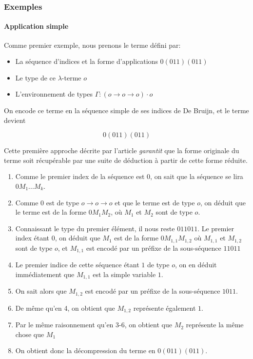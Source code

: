 \documentclass[titlepage]{article}
\providecommand{\tightlist}{%
  \setlength{\itemsep}{0pt}\setlength{\parskip}{0pt}}
\let\oldparagraph\paragraph
\renewcommand{\paragraph}[1]{\oldparagraph{#1}\mbox{}}
\begin{document}
\subsubsection{Exemples}\label{exemples}

\paragraph{Application simple}

Comme premier exemple, nous prenons le terme défini par:

\begin{itemize}
\tightlist
\item
  La séquence d'indices et la forme d'applications \(0(011)(011)\)
\item
  Le type de ce \(\lambda\)-terme \(o\)
\item
  L'environnement de types
  \(\Gamma: (o \rightarrow o \rightarrow o) \cdot o\)
\end{itemize}

On encode ce terme en la séquence simple de ses indices de De Bruijn, et
le terme devient

\[0(011)(011)\]

Cette première approche décrite par l'article \emph{garantit} que la
forme originale du terme soit récupérable par une suite de déduction à
partir de cette forme réduite.

\begin{enumerate}
\def\labelenumi{\arabic{enumi}.}
\tightlist
\item
  Comme le premier index de la séquence est 0, on sait que la séquence
  se lira \(0M_1...M_k\).
\item
  Comme \(0\) est de type \(o \rightarrow o \rightarrow o\) et que le
  terme est de type \(o\), on déduit que le terme est de la forme
  \(0M_1M_2\), où \(M_1\) et \(M_2\) sont de type \(o\).
\item
  Connaissant le type du premier élément, il nous reste \(011011\). Le
  premier index étant 0, on déduit que \(M_1\) est de la forme
  \(0M_{1,1}M_{1,2}\) où \(M_{1,1}\) et \(M_{1,2}\) sont de type \(o\),
  et \(M_{1,1}\) est encodé par un préfixe de la sous-séquence \(11011\)
\item
  Le premier indice de cette séquence étant \(1\) de type \(o\), on en
  déduit immédiatement que \(M_{1,1}\) est la simple variable \(1\).
\item
  On sait alors que \(M_{1,2}\) est encodé par un préfixe de la
  sous-séquence \(1011\).
\item
  De même qu'en 4, on obtient que \(M_{1,2}\) représente également
  \(1\).
\item
  Par le même raisonnement qu'en 3-6, on obtient que \(M_2\) représente
  la même chose que \(M_1\)
\item
  On obtient donc la décompression du terme en \(0(011)(011)\).
\end{enumerate}
\end{document}
